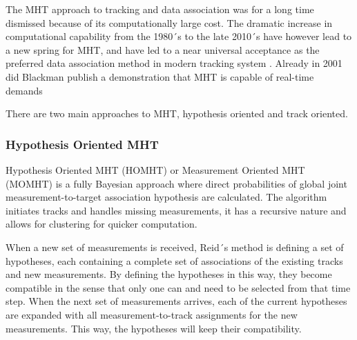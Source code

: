 The MHT approach to tracking and data association was for a long time dismissed because of its computationally large cost. The dramatic increase in computational capability from the 1980´s to the late 2010´s have however lead to a new spring for MHT, and have led to a near universal acceptance as the preferred data association method in modern tracking system \cite{Blackman2004}. Already in 2001 did Blackman publish a demonstration that MHT is capable of real-time demands \cite{Blackman2001}

There are two main approaches to MHT, hypothesis oriented and track oriented.

\subsubsection{Hypothesis Oriented MHT}
Hypothesis Oriented MHT (HOMHT) or Measurement Oriented MHT (MOMHT) is a fully Bayesian approach where direct probabilities of global joint measurement-to-target association hypothesis are calculated. The algorithm initiates tracks and handles missing measurements, it has a recursive nature and allows for clustering for quicker computation.
 
When a new set of measurements is received, Reid´s method is defining a set of hypotheses, each containing a complete set of associations of the existing tracks and new measurements. By defining the hypotheses in this way, they become compatible in the sense that only one can and need to be selected from that time step. %
When the next set of measurements arrives, each of the current hypotheses are expanded with all measurement-to-track assignments for the new measurements. This way, the hypotheses will keep their compatibility.

